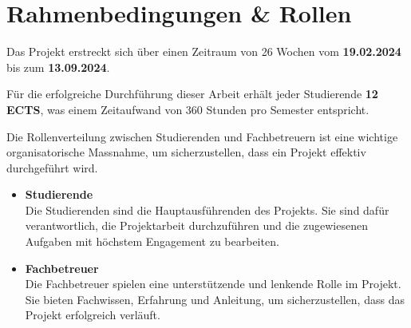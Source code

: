 \section{Rahmenbedingungen \& Rollen}
Das Projekt erstreckt sich über einen Zeitraum von 26 Wochen vom \textbf{19.02.2024} bis zum \textbf{13.09.2024}. 

Für die erfolgreiche Durchführung dieser Arbeit erhält jeder Studierende \textbf{12 ECTS}, was einem Zeitaufwand von 360 Stunden pro Semester entspricht. 

Die Rollenverteilung zwischen Studierenden und Fachbetreuern ist eine wichtige organisatorische Massnahme, um sicherzustellen, dass ein Projekt effektiv durchgeführt wird.

\begin{itemize}
    \item \textbf{Studierende} \\
    Die Studierenden sind die Hauptausführenden des Projekts. Sie sind dafür verantwortlich, die Projektarbeit durchzuführen und die zugewiesenen Aufgaben mit höchstem Engagement zu bearbeiten. 
    
    \item \textbf{Fachbetreuer} \\
    Die Fachbetreuer spielen eine unterstützende und lenkende Rolle im Projekt. Sie bieten Fachwissen, Erfahrung und Anleitung, um sicherzustellen, dass das Projekt erfolgreich verläuft. 
\end{itemize}